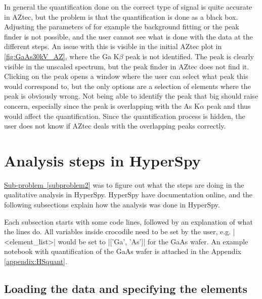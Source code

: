 In general the quantification done on the correct type of signal is quite accurate in AZtec, but the problem is that the quantification is done as a black box.
Adjusting the parameters of for example the background fitting or the peak finder is not possible, and the user cannot see what is done with the data at the different steps.
An issue with this is visible in the initial AZtec plot in \cref{fig:GaAs30kV_AZ}, where the Ga K$\beta$ peak is not identified.
The peak is clearly visible in the unscaled spectrum, but the peak finder in AZtec does not find it.
Clicking on the peak opens a window where the user can select what peak this would correspond to, but the only options are a selection of elements where the peak is obviously wrong.
Not being able to identify the peak that big should raise concern, especially since the peak is overlapping with the As K$\alpha$ peak and thus would affect the quantification.
Since the quantification process is hidden, the user does not know if AZtec deals with the overlapping peaks correctly.









%
%
\section{Analysis steps in HyperSpy}
\label{sec:discussion:steps}

\hyperref[subproblem2]{Sub-problem~\ref*{subproblem2}} was to figure out what the steps are doing in the qualitative analysis in HyperSpy.
HyperSpy have documentation online, and the following subsections explain how the analysis was done in HyperSpy.


Each subsection starts with some code lines, followed by an explanation of what the lines do.
All variables inside crocodile need to be set by the user, e.g. \cverb|<element_list>| would be set to \cverb|['Ga', 'As']| for the GaAs wafer.
An example notebook with quantification of the GaAs wafer is attached in the Appendix \cref{appendix:HSquant}.







\subsection{Loading the data and specifying the elements}
\label{sec:discussion:steps:load}

